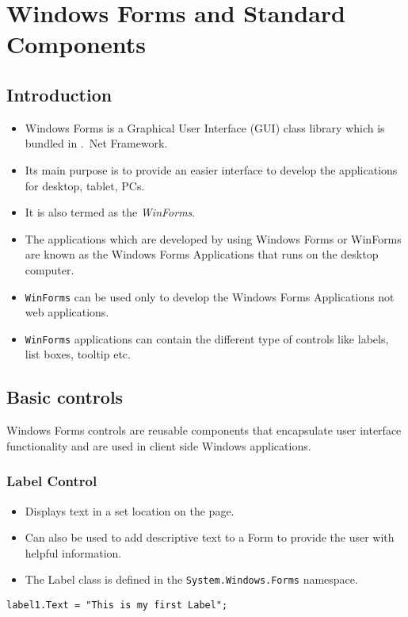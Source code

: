 \chapter{Windows Forms and Standard Components}

\section{Introduction}
\begin{itemize}
	\item Windows Forms is a Graphical User Interface (GUI) class library which is bundled in .\ Net Framework. 
	\item Its main purpose is to provide an easier interface to develop the applications for desktop, tablet, PCs. 
	\item It is also termed as the \textit{WinForms}. 
	\item The applications which are developed by using Windows Forms or WinForms are known as the Windows Forms Applications that runs on the desktop computer.
	\item \texttt{WinForms} can be used only to develop the Windows Forms Applications not web applications. 
	\item \texttt{WinForms} applications can contain the different type of controls like labels, list boxes, tooltip etc.
\end{itemize}

\section{Basic controls}
Windows Forms controls are reusable components that encapsulate user interface functionality and are used in client side Windows applications.
\subsection{Label Control}
\begin{itemize}
	\item Displays text in a set location on the page. 
	\item Can also be used to add descriptive text to a Form to provide the user with helpful information. 
	\item The Label class is defined in the \texttt{System.Windows.Forms} namespace.
\end{itemize}

\begin{lstlisting}[numbers=none]
	label1.Text = "This is my first Label";	
\end{lstlisting}


